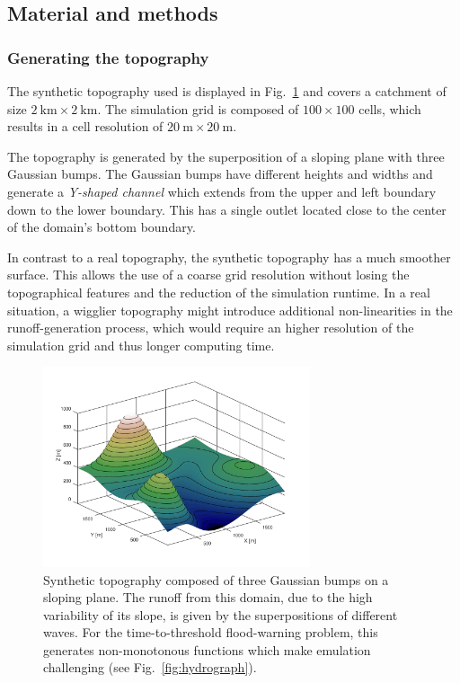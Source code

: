 \subsection{Material and methods}
\subsubsection{Generating the topography}

The synthetic topography used is displayed in Fig.~\ref{fig:topography} and covers a catchment of size $\SI{2}{\kilo\meter} \times \SI{2}{\kilo\meter}$. 
The simulation grid is composed of $\num{100} \times \num{100}$ cells, which results in a cell resolution of $\SI{20}{\meter} \times \SI{20}{\meter}.$

The topography is generated by the superposition of a sloping plane with three Gaussian bumps.
The Gaussian bumps have different heights and widths and generate a \emph{Y-shaped channel} which extends from the upper and left boundary down to the lower boundary.
This has a single outlet located close to the center of the domain's bottom boundary.

In contrast to a real topography, the synthetic topography has a much smoother surface. This allows the use of a coarse grid resolution without losing the topographical features and the reduction of the simulation runtime. 
In a real situation, a wigglier topography might introduce additional non-linearities in the runoff-generation process, which would require an higher resolution of the simulation grid and thus longer computing time.

\begin{figure}[h]
  \centering
  \includegraphics[width=0.7\textwidth]{Figures/topography.png}
  \caption{Synthetic topography composed of three Gaussian bumps on a sloping plane. The runoff from this domain, due to the high variability of its slope, is given by the superpositions of different waves. For the time-to-threshold flood-warning problem, this generates non-monotonous functions which make emulation challenging (see Fig.~\ref{fig:hydrograph}).}
  \label{fig:topography}
\end{figure}

